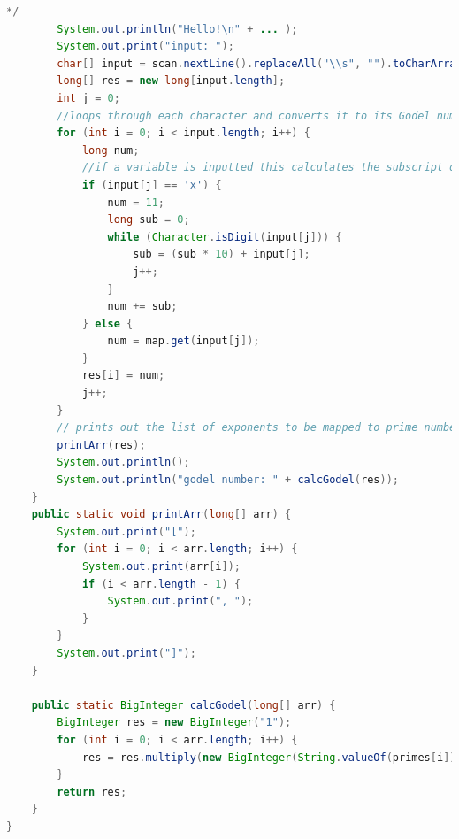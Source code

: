 \documentclass[conference]{IEEEtran}
\begin{document}
\begin{lstlisting}[language=Java]
        */
        System.out.println("Hello!\n" + ... );
        System.out.print("input: ");
        char[] input = scan.nextLine().replaceAll("\\s", "").toCharArray();
        long[] res = new long[input.length];
        int j = 0;
        //loops through each character and converts it to its Godel number according to the table
        for (int i = 0; i < input.length; i++) {
            long num;
            //if a variable is inputted this calculates the subscript of the variable 
            if (input[j] == 'x') {
                num = 11;
                long sub = 0;
                while (Character.isDigit(input[j])) {
                    sub = (sub * 10) + input[j];
                    j++;
                }
                num += sub;
            } else {
                num = map.get(input[j]);
            }
            res[i] = num;
            j++;
        }
        // prints out the list of exponents to be mapped to prime numbers
        printArr(res);
        System.out.println();
        System.out.println("godel number: " + calcGodel(res));
    }
    public static void printArr(long[] arr) {
        System.out.print("[");
        for (int i = 0; i < arr.length; i++) {
            System.out.print(arr[i]);
            if (i < arr.length - 1) {
                System.out.print(", ");
            }
        }
        System.out.print("]");
    }

    public static BigInteger calcGodel(long[] arr) {
        BigInteger res = new BigInteger("1");
        for (int i = 0; i < arr.length; i++) {
            res = res.multiply(new BigInteger(String.valueOf(primes[i])).pow((int) arr[i]));
        }
        return res;
    }
}
\end{lstlisting}
    
\end{document}

